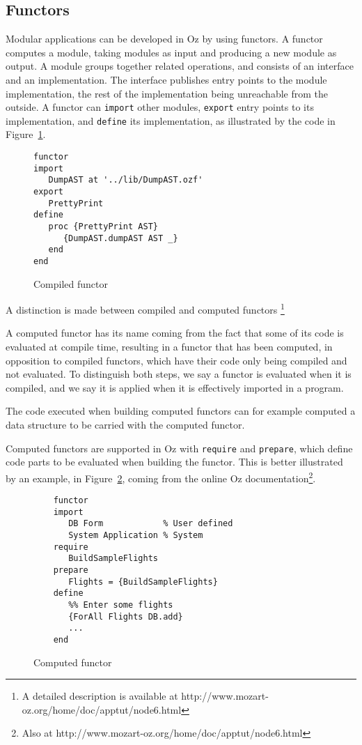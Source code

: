 \documentclass[a4paper]{memoir}
\begin{document}
\subsection{Functors}\label{sec:input:functors}
Modular applications can be developed in Oz by using functors. A functor
computes a module, taking modules as input and producing a new module as output.
A module groups together related operations, and consists of an interface and an implementation.
The interface publishes entry points to the module implementation, the rest of
the implementation being unreachable from the outside.
A functor can \lstinline!import! other modules, \lstinline!export! entry points to
its implementation, and \lstinline!define! its implementation, as illustrated by
the code in Figure~\ref{fig:compiled_functor}.
\begin{figure}[h]
\begin{lstlisting}
functor
import
   DumpAST at '../lib/DumpAST.ozf'
export
   PrettyPrint
define
   proc {PrettyPrint AST}
      {DumpAST.dumpAST AST _}
   end
end
\end{lstlisting}
\caption{Compiled functor}
\label{fig:compiled_functor}
\end{figure}

A distinction is made between compiled and computed functors
\footnote{A detailed description is available at
http://www.mozart-oz.org/home/doc/apptut/node6.html}

A computed functor has its name coming from the fact that some of its code is evaluated
at compile time, resulting in a functor that has been computed, in opposition to
compiled functors, which have their code only being compiled and not evaluated.
To distinguish both steps, we say a functor is evaluated when it is compiled, and we say it is
applied when it is effectively imported in a program.

The code executed when building computed functors can for example computed a
data structure to be carried with the computed functor.


Computed functors are supported in Oz with
\lstinline!require! and \lstinline!prepare!, which define code parts to be evaluated when
building the functor. This is better illustrated by an example, in
Figure~\ref{fig:computed_functor}, coming from the online Oz
documentation\footnote{Also at http://www.mozart-oz.org/home/doc/apptut/node6.html}.

\begin{figure}[h]
\begin{lstlisting}
    functor 
    import 
       DB Form            % User defined
       System Application % System
    require
       BuildSampleFlights
    prepare 
       Flights = {BuildSampleFlights}
    define 
       %% Enter some flights
       {ForAll Flights DB.add}
       ... 
    end
\end{lstlisting}
\caption{Computed functor}
\label{fig:computed_functor}
\end{figure}
\end{document}
